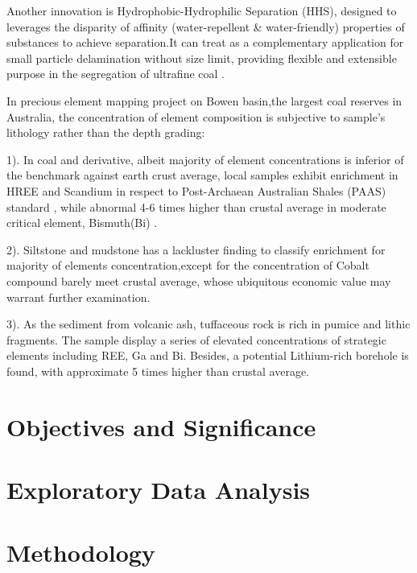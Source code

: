 \documentclass[11pt,a4paper,]{article}
\begin{document}
Another innovation is Hydrophobic-Hydrophilic Separation (HHS), designed to leverages the disparity of affinity (water-repellent \& water-friendly) properties of substances to achieve separation.It can treat as a complementary application for small particle delamination without size limit, providing flexible and extensible purpose in the segregation of ultrafine coal \textcite{Hodgkinson2021}.

In precious \textcite{Hodgkinson2020} element mapping project on Bowen basin,the largest coal reserves in Australia, the concentration of element composition is subjective to sample's lithology rather than the depth grading:

1). In coal and derivative, albeit majority of element concentrations is inferior of the benchmark against earth crust average, local samples exhibit enrichment in HREE and Scandium in respect to \textcite{McLennan2011} Post-Archaean Australian Shales (PAAS) standard , while abnormal 4-6 times higher than crustal average in moderate critical element, Bismuth(Bi) .

2). Siltstone and mudstone has a lackluster finding to classify enrichment for majority of elements concentration,except for the concentration of Cobalt compound barely meet crustal average, whose ubiquitous economic value may warrant further examination.

3). As the sediment from volcanic ash, tuffaceous rock is rich in pumice and lithic fragments. The sample display a series of elevated concentrations of strategic elements including REE, Ga and Bi. Besides, a potential Lithium-rich borehole is found, with approximate 5 times higher than crustal average.

\hypertarget{objectives-and-significance}{%
\section{Objectives and Significance}\label{objectives-and-significance}}

\hypertarget{exploratory-data-analysis}{%
\section{Exploratory Data Analysis}\label{exploratory-data-analysis}}

\hypertarget{methodology}{%
\section{Methodology}\label{methodology}}
\end{document}

